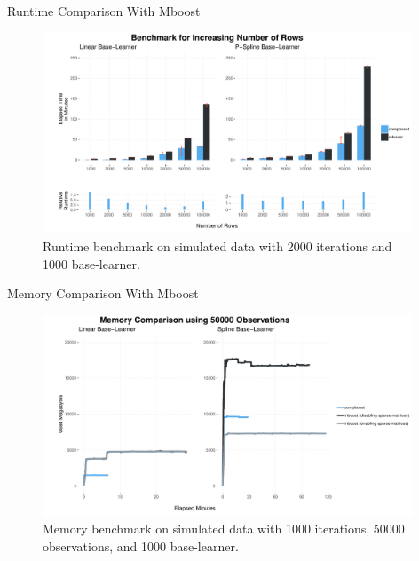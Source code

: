 \documentclass[10pt]{beamer}\usepackage[]{graphicx}\usepackage[]{color}
\newenvironment{knitrout}{}{} %
\begin{document}
\begin{frame}[fragile]{Runtime Comparison With Mboost}

\begin{center}
\begin{knitrout}
\color{fgcolor}\begin{figure}
\includegraphics[width=11cm,height=6cm]{figure/unnamed-chunk-15-1} \caption[Runtime benchmark on simulated data with 2000 iterations and 1000 base-learner]{Runtime benchmark on simulated data with 2000 iterations and 1000 base-learner.}\label{fig:unnamed-chunk-15}
\end{figure}


\end{knitrout}
\end{center}

\end{frame}


\begin{frame}{Memory Comparison With Mboost}

\begin{center}
\begin{knitrout}
\color{fgcolor}\begin{figure}
\includegraphics[width=11cm,height=6cm]{figure/unnamed-chunk-16-1} \caption[Memory benchmark on simulated data with 1000 iterations, 50000 observations, and 1000 base-learner]{Memory benchmark on simulated data with 1000 iterations, 50000 observations, and 1000 base-learner.}\label{fig:unnamed-chunk-16}
\end{figure}


\end{knitrout}
\end{center}

\end{frame}
\end{document}
